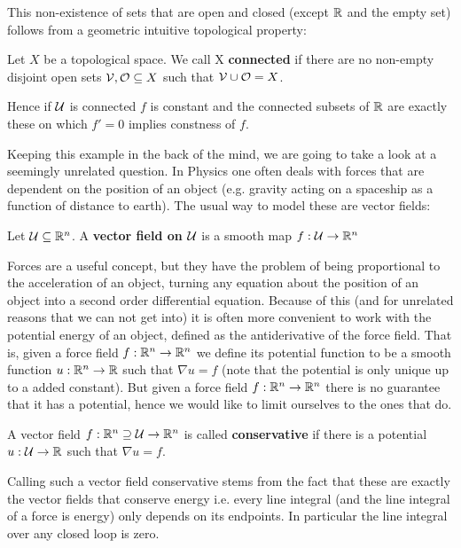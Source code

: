 This non-existence of sets that are open and closed (except $\mathbb{R}$ and the empty set) follows from a
geometric intuitive topological property:
\begin{definition}
	Let $X$ be a topological space. We call X \textbf{connected} if there are no non-empty
	disjoint open sets $\mathcal{V}, \mathcal{O} \subseteq X$ such that $\mathcal{V} \cup \mathcal{O} = X$.
\end{definition}
Hence if $\mathcal{U}$ is connected $f$ is constant and the connected subsets of $\mathbb{R}$ are exactly
these on which $f' = 0$ implies constness of $f$.

Keeping this example in the back of the mind, we are going to take a look at a seemingly unrelated
question. In Physics one often deals with forces that are dependent on the position of an object (e.g. gravity
acting on a spaceship as a function of distance to earth). The usual way to model these are vector fields:
\begin{definition}
Let $\mathcal{U} \subseteq \mathbb{R}^n$. A \textbf{vector field on $\mathcal{U}$} is a smooth map $f: \mathcal{U} \to \mathbb{R}^n$
\end{definition}

Forces are a useful concept, but they have the problem of being proportional to the acceleration
of an object, turning any equation about the position of an object into a second order differential
equation. Because of this (and for unrelated reasons that we can not get into) it is often more convenient
to work with the potential energy of an object, defined as the antiderivative of the force field. That is,
given a  force field $f: \mathbb{R}^n \to \mathbb{R}^n$ we define its potential function to be a smooth function $u: \mathbb{R}^n \to \mathbb{R}$
such that $\nabla u = f$ (note that the potential is only unique up to a added constant). But given a force field $f: \mathbb{R}^n \to \mathbb{R}^n$
there is no guarantee that it has a potential, hence we would like to limit ourselves to the ones that do.
\begin{definition}
A vector field $f: \mathbb{R}^n \supseteq \mathcal{U} \to \mathbb{R}^n$ is called \textbf{conservative} if there is a potential $u: \mathcal{U} \to \mathbb{R}$
such that $\nabla u = f$.
\end{definition}
Calling such a vector field conservative stems from the fact that these are exactly the vector
fields that conserve energy i.e. every line integral (and the line integral of a force is
energy) only depends on its endpoints. In particular the line integral over any closed loop is
zero.

